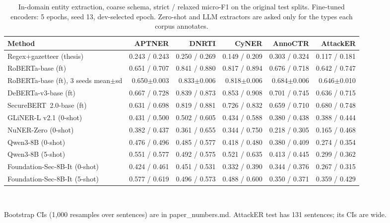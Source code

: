 \begin{table}[t]
\centering
\caption{In-domain entity extraction, coarse schema, strict / relaxed micro-F1 on the original test splits. Fine-tuned encoders: 5 epochs, seed 13, dev-selected epoch. Zero-shot and LLM extractors are asked only for the types each corpus annotates.}
\label{tab:indomain}
\small
\begin{adjustbox}{max width=\textwidth}
\begin{tabular}{lrrrrr}
\toprule
Method & APTNER & DNRTI & CyNER & AnnoCTR & AttackER \\
\midrule
Regex+gazetteer (thesis) & 0.243 / 0.243 & 0.250 / 0.269 & 0.149 / 0.209 & 0.303 / 0.324 & 0.117 / 0.181 \\
RoBERTa-base (ft) & 0.651 / 0.707 & 0.841 / 0.880 & 0.817 / 0.894 & 0.676 / 0.718 & 0.642 / 0.747 \\
RoBERTa-base (ft), 3 seeds mean$\pm$sd & 0.650$\pm$0.003 & 0.833$\pm$0.006 & 0.818$\pm$0.006 & 0.684$\pm$0.006 & 0.646$\pm$0.010 \\
DeBERTa-v3-base (ft) & 0.667 / 0.728 & 0.839 / 0.873 & 0.853 / 0.908 & 0.701 / 0.745 & 0.636 / 0.715 \\
SecureBERT~2.0-base (ft) & 0.631 / 0.698 & 0.819 / 0.881 & 0.726 / 0.832 & 0.659 / 0.710 & 0.680 / 0.748 \\
GLiNER-L v2.1 (0-shot) & 0.431 / 0.500 & 0.502 / 0.605 & 0.434 / 0.588 & 0.380 / 0.438 & 0.388 / 0.444 \\
NuNER-Zero (0-shot) & 0.382 / 0.437 & 0.361 / 0.655 & 0.344 / 0.750 & 0.218 / 0.305 & 0.165 / 0.468 \\
Qwen3-8B (0-shot) & 0.476 / 0.496 & 0.485 / 0.577 & 0.418 / 0.480 & 0.380 / 0.409 & 0.274 / 0.354 \\
Qwen3-8B (5-shot) & 0.551 / 0.577 & 0.492 / 0.575 & 0.521 / 0.635 & 0.413 / 0.445 & 0.299 / 0.362 \\
Foundation-Sec-8B-It (0-shot) & 0.424 / 0.461 & 0.451 / 0.531 & 0.332 / 0.390 & 0.344 / 0.376 & 0.267 / 0.315 \\
Foundation-Sec-8B-It (5-shot) & 0.577 / 0.619 & 0.496 / 0.573 & 0.488 / 0.600 & 0.350 / 0.371 & 0.359 / 0.429 \\
\bottomrule
\end{tabular}
\end{adjustbox}
\\[2pt]\parbox{\textwidth}{\footnotesize Bootstrap CIs (1,000 resamples over sentences) are in paper\_numbers.md. AttackER test has 131 sentences; its CIs are wide.}
\end{table}